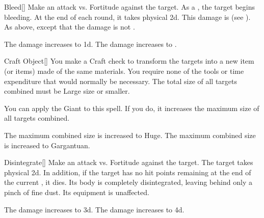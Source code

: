 \lowercase{\hypertarget{spell:Bleed}{}}\label{spell:Bleed}
\begin{freeability}[Rank 4]{\hypertarget{spell:Bleed}{Bleed}}[]
Make an attack vs. Fortitude against the target.
\hit As a , the target begins bleeding.
At the end of each round, it takes physical  \minus2d.
This damage is  (see ).
\crit As above, except that the damage is not .

\rankline
{} The damage increases to  \minus1d.
 The damage increases to .
\end{freeability}
\vspace{0.25em}



\lowercase{\hypertarget{spell:Craft Object}{}}\label{spell:Craft Object}
\begin{freeability}[Rank 4]{\hypertarget{spell:Craft Object}{Craft Object}}[]
You make a Craft check to transform the targets into a new item (or items) made of the same materials.
You require none of the tools or time expenditure that would normally be necessary.
The total size of all targets combined must be Large size or smaller.

You can apply the Giant  to this spell.
If you do, it increases the maximum size of all targets combined.

\rankline
{} The maximum combined size is increased to Huge.
 The maximum combined size is increased to Gargantuan.
\end{freeability}
\vspace{0.25em}



\lowercase{\hypertarget{spell:Disintegrate}{}}\label{spell:Disintegrate}
\begin{freeability}[Rank 4]{\hypertarget{spell:Disintegrate}{Disintegrate}}[]
Make an attack vs. Fortitude against the target.
\hit The target takes physical  \plus2d.
In addition, if the target has no hit points remaining at the end of the current , it dies.
Its body is completely disintegrated, leaving behind only a pinch of fine dust.
Its equipment is unaffected.

\rankline
{} The damage increases to  \plus3d.
 The damage increases to  \plus4d.
\end{freeability}
\vspace{0.25em}



